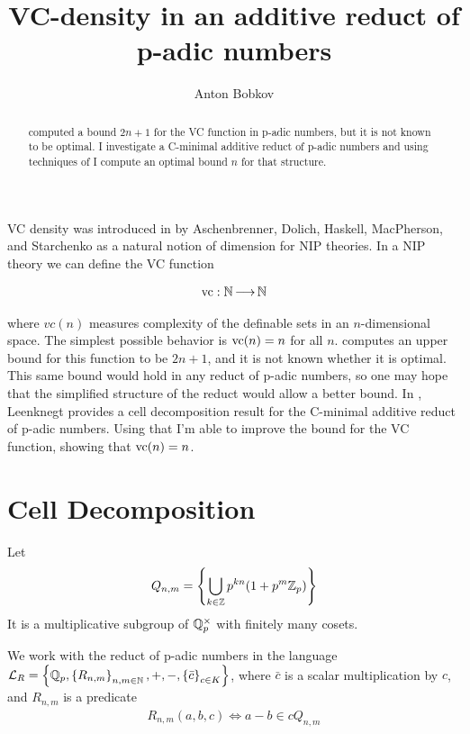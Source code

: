 \documentclass{amsart}
\title{VC-density in an additive reduct of p-adic numbers}
\author{Anton Bobkov}
\renewcommand{\LL}{\mathcal L_R}
\newcommand{\curly}[1]{\left\{#1\right\}}
\begin{document}
\begin{abstract}
	\cite{density} computed a bound $2n+1$ for the VC function in p-adic numbers, but it is not known to be optimal.
	I investigate a C-minimal additive reduct of p-adic numbers and using techniques of \cite{reduct} I compute an optimal bound $n$ for that structure.
\end{abstract}


\maketitle

VC density was introduced in \cite{density} by Aschenbrenner, Dolich, Haskell, MacPherson, and Starchenko as a natural notion of dimension for NIP theories.
In a NIP theory we can define the VC function

\begin{align*}
	\operatorname{vc} : \mathbb{N} \operatorname{\longrightarrow} \mathbb{N}
\end{align*}

where $vc(n)$ measures complexity of the definable sets in an $n$-dimensional space.
The simplest possible behavior is $\operatorname{vc}(n) = n$ for all $n$.
\cite{density} computes an upper bound for this function to be $2n+1$, and it is not known whether it is optimal.
This same bound would hold in any reduct of p-adic numbers, so one may hope that the simplified structure of the reduct would allow a better bound.
In \cite{reduct}, Leenknegt provides a cell decomposition result for the C-minimal additive reduct of p-adic numbers.
Using that I'm able to improve the bound for the VC function, showing that $\operatorname{vc}(n) = n$.


\section{Cell Decomposition}


\begin{Definition}
	Let
	\begin{align*}
		Q_{n,m} = \curly{\bigcup_{k \in \Z} p^{kn} (1 + p^m\Z_p) }
	\end{align*}
	It is a multiplicative subgroup of $\mathbb{Q}_p^\times$ with finitely many cosets.
\end{Definition}

We work with the reduct of p-adic numbers in the language $\LL = \curly{\Q_p, \curly{R_{n,m}}_{n,m\in \N}, +, -, \curly{\bar c}_{c \in K} }$,
where $\bar c$ is a scalar multiplication by $c$, and $R_{n,m}$ is a predicate
\begin{align*}
	R_{n,m} (a, b, c) \Leftrightarrow a - b \in c Q_{n,m}
\end{align*}
\end{document}
